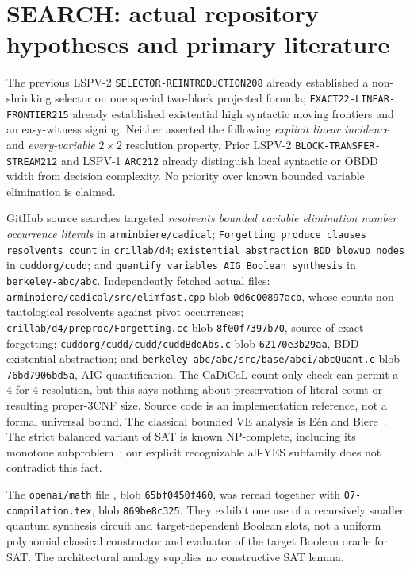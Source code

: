 \documentclass[11pt]{article}
\begin{document}
\section{SEARCH: actual repository hypotheses and primary literature}
The previous LSPV-2 \texttt{SELECTOR-REINTRODUCTION208} already established a non-shrinking selector on one special two-block projected formula; \texttt{EXACT22-LINEAR-FRONTIER215} already established existential high syntactic moving frontiers and an easy-witness signing. Neither asserted the following \emph{explicit linear incidence} and \emph{every-variable} $2\times2$ resolution property. Prior LSPV-2 \texttt{BLOCK-TRANSFER-STREAM212} and LSPV-1 \texttt{ARC212} already distinguish local syntactic or OBDD width from decision complexity. No priority over known bounded variable elimination is claimed.

GitHub source searches targeted \emph{resolvents bounded variable elimination number occurrence literals} in \texttt{arminbiere/cadical}; \texttt{Forgetting produce clauses resolvents count} in \texttt{crillab/d4}; \texttt{existential abstraction BDD blowup nodes} in \texttt{cuddorg/cudd}; and \texttt{quantify variables AIG Boolean synthesis} in \texttt{berkeley-abc/abc}. Independently fetched actual files: \texttt{arminbiere/cadical/src/elimfast.cpp} blob \texttt{0d6c00897acb}, whose  counts non-tautological resolvents against pivot occurrences; \texttt{crillab/d4/preproc/Forgetting.cc} blob \texttt{8f00f7397b70}, source of exact forgetting; \texttt{cuddorg/cudd/cudd/cuddBddAbs.c} blob \texttt{62170e3b29aa}, BDD existential abstraction; and \texttt{berkeley-abc/abc/src/base/abci/abcQuant.c} blob \texttt{76bd7906bd5a}, AIG quantification. The CaDiCaL count-only check can permit a $4$-for-$4$ resolution, but this says nothing about preservation of literal count or resulting proper-3CNF size. Source code is an implementation reference, not a formal universal bound. The classical bounded VE analysis is E\'en and Biere~\cite{eenbiere}. The strict balanced variant of SAT is known NP-complete, including its monotone subproblem~\cite{docker}; our explicit recognizable all-YES subfamily does not contradict this fact.

The \texttt{openai/math} file , blob \texttt{65bf0450f460}, was reread together with \texttt{07-compilation.tex}, blob \texttt{869be8c325}. They exhibit one use of a recursively smaller quantum synthesis circuit and target-dependent Boolean slots, not a uniform polynomial classical constructor and evaluator of the target Boolean oracle for SAT. The architectural analogy supplies no constructive SAT lemma.
\end{document}
